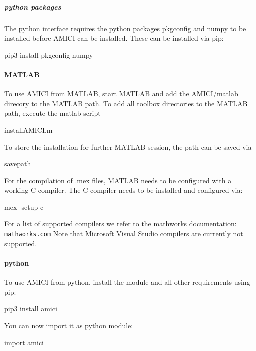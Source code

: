 \subparagraph*{python packages}

The python interface requires the python packages {\ttfamily pkgconfig} and {\ttfamily numpy} to be installed before A\+M\+I\+CI can be installed. These can be installed via {\ttfamily pip}\+: \begin{DoxyVerb}pip3 install pkgconfig numpy
\end{DoxyVerb}


\paragraph*{M\+A\+T\+L\+AB}

To use A\+M\+I\+CI from M\+A\+T\+L\+AB, start M\+A\+T\+L\+AB and add the A\+M\+I\+C\+I/matlab direcory to the M\+A\+T\+L\+AB path. To add all toolbox directories to the M\+A\+T\+L\+AB path, execute the matlab script \begin{DoxyVerb}installAMICI.m
\end{DoxyVerb}


To store the installation for further M\+A\+T\+L\+AB session, the path can be saved via \begin{DoxyVerb}savepath
\end{DoxyVerb}


For the compilation of .mex files, M\+A\+T\+L\+AB needs to be configured with a working C compiler. The C compiler needs to be installed and configured via\+: \begin{DoxyVerb}mex -setup c
\end{DoxyVerb}


For a list of supported compilers we refer to the mathworks documentation\+: \href{http://mathworks.com/support/compilers/R2018b/index.html}{\texttt{ mathworks.\+com}} Note that Microsoft Visual Studio compilers are currently not supported.

\paragraph*{python}

To use A\+M\+I\+CI from python, install the module and all other requirements using pip\+: \begin{DoxyVerb}pip3 install amici
\end{DoxyVerb}


You can now import it as python module\+: \begin{DoxyVerb}import amici
\end{DoxyVerb}


